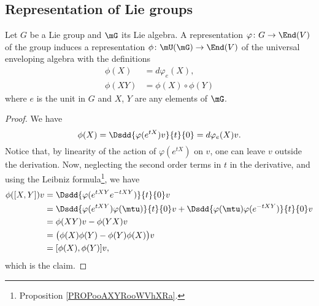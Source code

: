 \subsection{Representation of Lie groups}

\begin{proposition}
	Let $G$ be a Lie group and $\mG$ its Lie algebra. A representation $\varphi\colon G\to \End(V)$ of the group induces a representation $\phi\colon \mU(\mG)\to \End(V)$ of the universal enveloping algebra with the definitions
	\begin{subequations}
		\begin{align}
			\phi(X)  & =d\varphi_e(X),      \\
			\phi(XY) & =\phi(X)\circ\phi(Y)
		\end{align}
	\end{subequations}
	where $e$ is the unit in $G$ and $X$, $Y$ are any elements of $\mG$.
\end{proposition}

\begin{proof}
	We have
	\begin{equation}
		\phi(X)=\Dsdd{ \varphi( e^{tX})v }{t}{0}=d\varphi_e(X)v.
	\end{equation}
	Notice that, by linearity of the action of $\varphi( e^{tX})$ on $v$, one can leave $v$ outside the derivation. Now, neglecting the second order terms in $t$ in the derivative, and using the Leibniz formula\footnote{Proposition \ref{PROPooAXYRooWVhXRa}.}, we have
	\begin{equation}
		\begin{aligned}[]
			\phi([X,Y])v & =  \Dsdd{ \varphi( e^{tXY} e^{-tXY}) }{t}{0}v                                                     \\
			             & =  \Dsdd{ \varphi( e^{tXY})\varphi(\mtu) }{t}{0}v+\Dsdd{ \varphi(\mtu)\varphi( e^{-tXY}) }{t}{0}v \\
			             & =  \phi(XY)v-\phi(YX)v                                                                            \\
			             & =  \big( \phi(X)\phi(Y)-\phi(Y)\phi(X) \big)v                                                     \\
			             & =  [\phi(X),\phi(Y)]v,
		\end{aligned}
	\end{equation}
	which is the claim.
\end{proof}

